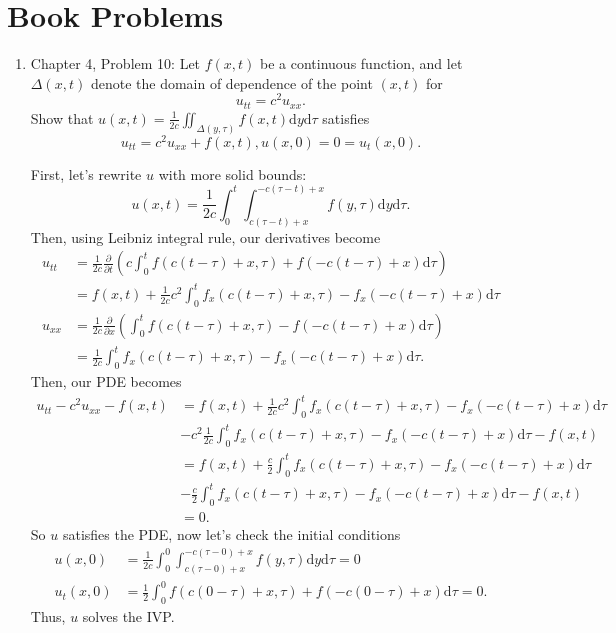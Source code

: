 \documentclass[a4paper,12pt]{article}
\newcommand{\dd}[1]{\mathrm{d}#1}
\begin{document}
\section*{Book Problems}
\begin{enumerate}[label = \arabic*.]
    \item Chapter 4, Problem 10: Let $ f(x,t) $ be a continuous function, and let $ \Delta(x,t) $ denote the domain of dependence of the point $ (x,t) $ for 
    \[
    	u_{tt} = c^2 u_{xx}.
    \]
    Show that $ u(x,t) = \frac{1}{2c} \iint_{\Delta(y, \tau)} f(x,t)\dd y \dd \tau $ satisfies
    \[
    	u_{tt} = c^2 u_{xx} + f(x,t), u(x,0) = 0 = u_t(x,0).
    \]
    
    First, let's rewrite $ u $ with more solid bounds:
    \[
    	u(x,t) = \frac{1}{2c} \int_0^t \int_{c (\tau - t) + x}^{-c(\tau - t) + x} f(y,\tau) \dd y \dd \tau.
    \]
    Then, using Leibniz integral rule, our  derivatives become
    \begin{align*}
    	u_{tt} &= \frac{1}{2c} \frac{\partial}{\partial t} \left(c \int_{0}^{t} f(c(t - \tau) + x, \tau) + f(-c(t - \tau) + x) \dd \tau \right) \\
    	&=  f(x,t) + \frac{1}{2c}c^2 \int_{0}^{t} f_x(c(t - \tau) + x, \tau) - f_x(-c(t - \tau) + x) \dd \tau \\
    	u_{xx} &= \frac{1}{2c} \frac{\partial}{\partial x} \left(\int_{0}^{t} f(c(t - \tau) + x, \tau) - f(-c(t - \tau) + x) \dd \tau \right) \\
    	&= \frac{1}{2c} \int_{0}^{t} f_x(c(t - \tau) + x, \tau) - f_x(-c(t - \tau) + x) \dd \tau.
    \end{align*}
	Then, our PDE becomes
	\begin{align*}
		u_{tt} - c^2 u_{xx}  - f(x,t) &= f(x,t) + \frac{1}{2c}c^2 \int_{0}^{t} f_x(c(t - \tau) + x, \tau) - f_x(-c(t - \tau) + x) \dd \tau \\
		&- c^2 \frac{1}{2c} \int_{0}^{t} f_x(c(t - \tau) + x, \tau) - f_x(-c(t - \tau) + x) \dd \tau - f(x,t) \\
		&= f(x,t) + \frac{c}{2} \int_{0}^{t} f_x(c(t - \tau) + x, \tau) - f_x(-c(t - \tau) + x) \dd \tau \\
		&- \frac{c}{2} \int_{0}^{t} f_x(c(t - \tau) + x, \tau) - f_x(-c(t - \tau) + x) \dd \tau - f(x,t) \\
		&= 0.
	\end{align*}
	So $ u $ satisfies the PDE, now let's check the initial conditions
	\begin{align*}
		u(x,0) &= \frac{1}{2c} \int_0^0 \int_{c (\tau - 0) + x}^{-c(\tau - 0) + x} f(y,\tau) \dd y \dd \tau = 0 \\
		u_t(x,0) &= \frac{1}{2} \int_{0}^{0} f(c(0 - \tau) + x, \tau) + f(-c(0 - \tau) + x) \dd \tau = 0.
	\end{align*}
	Thus, $ u $ solves the IVP.
     

\end{enumerate}
\end{document}
